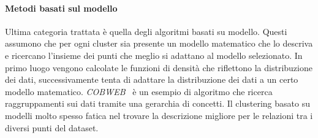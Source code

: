 \paragraph{Metodi basati sul modello}
Ultima categoria trattata è quella degli algoritmi basati su modello.
Questi assumono
che per ogni cluster sia presente un modello matematico che lo descriva e ricercano l'insieme dei punti che meglio si adattano
al modello selezionato.
In primo luogo vengono calcolate le funzioni di densità che riflettono la distribuzione dei dati,
successivamente tenta di adattare la distribuzione dei dati a un certo modello matematico. \textit{COBWEB}~\cite{fisher1987knowledge} è
un esempio di algoritmo che ricerca raggruppamenti sui dati tramite una gerarchia di concetti.
Il clustering basato su modelli molto spesso fatica nel trovare la descrizione migliore per le relazioni tra i diversi punti del dataset.





